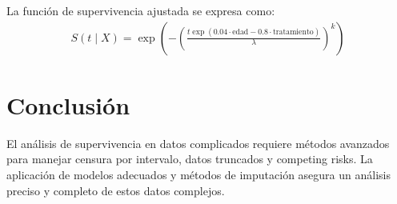 La funci\'on de supervivencia ajustada se expresa como:
\begin{eqnarray*}
S(t \mid X) = \exp\left(-\left(\frac{t \exp(0.04 \cdot \text{edad} - 0.8 \cdot \text{tratamiento})}{\lambda}\right)^k\right)
\end{eqnarray*}

\section{Conclusi\'on}
El an\'alisis de supervivencia en datos complicados requiere m\'etodos avanzados para manejar censura por intervalo, datos truncados y competing risks. La aplicaci\'on de modelos adecuados y m\'etodos de imputaci\'on asegura un an\'alisis preciso y completo de estos datos complejos.

